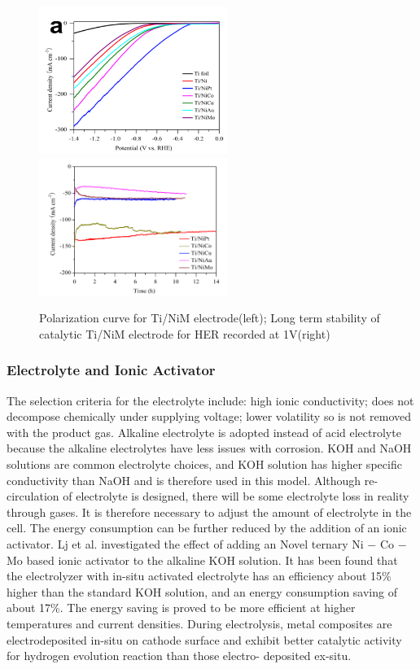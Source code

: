 \begin{figure}[H] 
\centering
\includegraphics[width=6.1cm]{polarization.png}
\includegraphics[width=6.1cm]{stability.png}
\caption{Polarization curve for Ti/NiM electrode(left); Long term stability of catalytic Ti/NiM electrode for HER recorded at 1V(right)
\label{fig:cat}
\cite{cathode}}
\end{figure}


\subsubsection{Electrolyte and Ionic Activator}
The selection criteria for the electrolyte include: high ionic conductivity;  does not decompose chemically under supplying voltage; lower volatility so is not removed with the product gas. Alkaline electrolyte is adopted instead of acid electrolyte because the alkaline electrolytes have less issues with corrosion. KOH and NaOH solutions are common electrolyte choices, and KOH solution has higher specific conductivity than NaOH and is therefore used in this model. Although re-circulation of electrolyte is designed, there will be some electrolyte loss in reality through gases. It is therefore necessary to adjust the amount of electrolyte in the cell. 
The energy consumption can be further reduced by the addition of an ionic activator. Lj et al. \cite{ionic} investigated the effect of adding an Novel ternary Ni $-$ Co $-$ Mo based ionic activator to the alkaline KOH solution. It has been found that the electrolyzer with in-situ activated electrolyte has an efficiency about 15\% higher than the standard KOH solution, and an energy consumption saving of about 17\%. The energy saving is proved to be more efficient at higher temperatures and current densities. During electrolysis, metal composites are electrodeposited in-situ on cathode surface and exhibit better catalytic activity for hydrogen evolution reaction than those electro- deposited ex-situ. 


